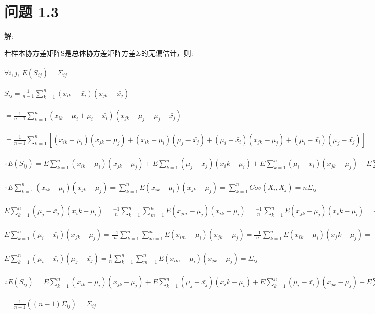 \documentclass[]{article}
\begin{document}
\section{问题 1.3}
\begin{flushleft}
	解:
\end{flushleft}
若样本协方差矩阵S是总体协方差矩阵方差$\Sigma$的无偏估计，则:\\\\
$\forall i,j,\  E(S_{ij})=\Sigma_{ij}$\\\\
$S_{ij}=\frac{1}{n-1}\sum_{k=1}^{n}(x_{ik}-\bar{x_i})(x_{jk}-\bar{x_j})$\\\\
$=\frac{1}{n-1}\sum_{k=1}^{n}(x_{ik}-\mu_i+\mu_i-\bar{x_i})(x_{jk}-\mu_j+\mu_j-\bar{x_j})$\\\\
$=\frac{1}{n-1}\sum_{k=1}^{n}\left[(x_{ik}-\mu_i)(x_{jk}-\mu_j)+(x_{ik}-\mu_i)(\mu_j-\bar{x_j})+(\mu_i-\bar{x_i})(x_{jk}-\mu_j)+(\mu_i-\bar{x_i})(\mu_j-\bar{x_j})\right]$\\\\
$\therefore E(S_{ij})=E\sum_{k=1}^{n}(x_{ik}-\mu_i)(x_{jk}-\mu_j)+E\sum_{k=1}^{n}(\mu_j-\bar{x_j})(x_ik-\mu_i)+E\sum_{k=1}^{n}(\mu_i-\bar{x_i})(x_{jk}-\mu_j)+E\sum_{k=1}^{n}(\mu_i-\bar{x_i})(\mu_j-\bar{x_j})$\\\\
$\because E\sum_{k=1}^{n}(x_{ik}-\mu_i)(x_{jk}-\mu_j)=\sum_{k=1}^{n}E(x_{ik}-\mu_i)(x_{jk}-\mu_j)=\sum_{k=1}^{n}Cov(X_i,X_j)=n\Sigma_{ij}$\\\\
$E\sum_{k=1}^{n}(\mu_j-\bar{x_j})(x_ik-\mu_i)=\frac{-1}{n}\sum_{k=1}^{n}\sum_{m=1}^{n}E(x_{jm}-\mu_j)(x_{ik}-\mu_i)=\frac{-1}{n}\sum_{k=1}^{n}E(x_{jk}-\mu_j)(x_ik-\mu_i)=-\Sigma_{ij}$\\\\
$E\sum_{k=1}^{n}(\mu_i-\bar{x_i})(x_{jk}-\mu_j)=\frac{-1}{n}\sum_{k=1}^{n}\sum_{m=1}^{n}E(x_{im}-\mu_i)(x_{jk}-\mu_j)=\frac{-1}{n}\sum_{k=1}^{n}E(x_{ik}-\mu_i)(x_jk-\mu_j)=-\Sigma_{ij}$\\\\
$E\sum_{k=1}^{n}(\mu_i-\bar{x_i})(\mu_j-\bar{x_j})=\frac{1}{n}\sum_{k=1}^{n}\sum_{m=1}^{n}E(x_{im}-\mu_i)(x_{jk}-\mu_j)=\Sigma_{ij}$\\\\
$\therefore E(S_{ij})=E\sum_{k=1}^{n}(x_{ik}-\mu_i)(x_{jk}-\mu_j)+E\sum_{k=1}^{n}(\mu_j-\bar{x_j})(x_ik-\mu_i)+E\sum_{k=1}^{n}(\mu_i-\bar{x_i})(x_{jk}-\mu_j)+E\sum_{k=1}^{n}(\mu_i-\bar{x_i})(\mu_j-\bar{x_j})$\\\\
$=\frac{1}{n-1}((n-1)\Sigma_{ij})=\Sigma_{ij}$\\\\
\end{document}
